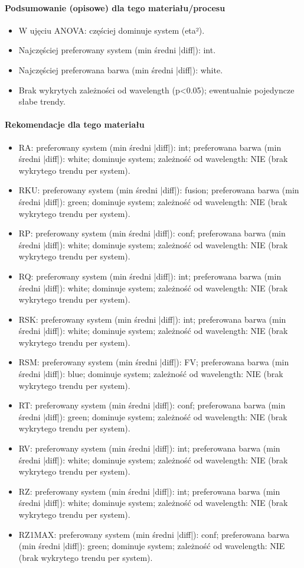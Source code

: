 \documentclass[
  10pt,
]{article}
\begin{document}
\paragraph{Podsumowanie (opisowe) dla tego materiału/procesu}
\begin{itemize}
\item W ujęciu ANOVA: częściej dominuje system (eta²).
\item Najczęściej preferowany system (min średni |diff|): int.
\item Najczęściej preferowana barwa (min średni |diff|): white.
\item Brak wykrytych zależności od wavelength (p<0.05); ewentualnie pojedyncze słabe trendy.
\end{itemize}
\paragraph{Rekomendacje dla tego materiału}
\begin{itemize}
\item RA: preferowany system (min średni |diff|): int; preferowana barwa (min średni |diff|): white; dominuje system; zależność od wavelength: NIE (brak wykrytego trendu per system).
\item RKU: preferowany system (min średni |diff|): fusion; preferowana barwa (min średni |diff|): green; dominuje system; zależność od wavelength: NIE (brak wykrytego trendu per system).
\item RP: preferowany system (min średni |diff|): conf; preferowana barwa (min średni |diff|): white; dominuje system; zależność od wavelength: NIE (brak wykrytego trendu per system).
\item RQ: preferowany system (min średni |diff|): int; preferowana barwa (min średni |diff|): white; dominuje system; zależność od wavelength: NIE (brak wykrytego trendu per system).
\item RSK: preferowany system (min średni |diff|): int; preferowana barwa (min średni |diff|): white; dominuje system; zależność od wavelength: NIE (brak wykrytego trendu per system).
\item RSM: preferowany system (min średni |diff|): FV; preferowana barwa (min średni |diff|): blue; dominuje system; zależność od wavelength: NIE (brak wykrytego trendu per system).
\item RT: preferowany system (min średni |diff|): conf; preferowana barwa (min średni |diff|): green; dominuje system; zależność od wavelength: NIE (brak wykrytego trendu per system).
\item RV: preferowany system (min średni |diff|): int; preferowana barwa (min średni |diff|): white; dominuje system; zależność od wavelength: NIE (brak wykrytego trendu per system).
\item RZ: preferowany system (min średni |diff|): int; preferowana barwa (min średni |diff|): white; dominuje system; zależność od wavelength: NIE (brak wykrytego trendu per system).
\item RZ1MAX: preferowany system (min średni |diff|): conf; preferowana barwa (min średni |diff|): green; dominuje system; zależność od wavelength: NIE (brak wykrytego trendu per system).
\end{itemize}
\end{document}
